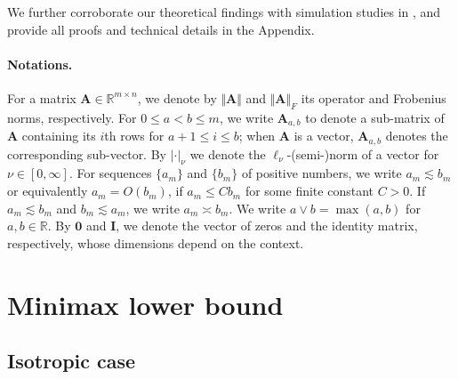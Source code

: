 \documentclass[11pt, a4paper]{article}
\newcommand{\mbf}{\mathbf}
\newcommand{\R}{\mathbb{R}}
\theoremstyle{definition}
\theoremstyle{definition}
\theoremstyle{definition}
\theoremstyle{definition}
\theoremstyle{definition}
\theoremstyle{remark}
\theoremstyle{definition}
\theoremstyle{definition}
\theoremstyle{definition}
\begin{document}
We further corroborate our theoretical findings with simulation studies in , and provide all proofs and technical details in the Appendix.

\paragraph{Notations.}
For a matrix $\mbf A \in \R^{m \times n}$, we denote by $\Vert \mbf A \Vert$ and $\Vert \mbf A \Vert_F$ its operator and Frobenius norms, respectively.
For $0 \le a < b \le m$, we write $\mbf A_{a, b}$ to denote a sub-matrix of $\mbf A$ containing its $i$th rows for $a + 1 \le i \le b$; when $\mbf A$ is a vector, $\mbf A_{a, b}$ denotes the corresponding sub-vector.
By $\lvert\cdot\rvert_\nu$ we denote the $\ell_\nu$-(semi-)norm of a vector for $\nu \in[0, \infty]$.
For sequences $\{a_m\}$ and $\{b_m\}$ of positive numbers, we write $a_m \lesssim b_m$ or equivalently $a_m = O(b_m)$, if $a_m \le C b_m$ for some finite constant $C > 0$. If $a_m \lesssim b_m$ and $b_m \lesssim a_m$, we write $a_m \asymp b_m$. We write $a \vee b = \max(a, b)$ for $a, b \in \R$.
By $\mbf 0$ and $\mbf I$, we denote the vector of zeros and the identity matrix, respectively, whose dimensions depend on the context.

\section{Minimax lower bound}
\label{sec:minimax}


\subsection{Isotropic case}
\label{sec:isotropic}
\end{document}
